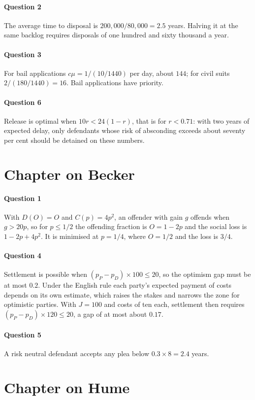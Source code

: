 \paragraph{Question 2} The average time to disposal is $200{,}000/80{,}000 = 2.5$ years. Halving it at the same backlog requires disposals of one hundred and sixty thousand a year.
\paragraph{Question 3} For bail applications $c\mu = 1/(10/1440)$ per day, about $144$; for civil suits $2/(180/1440) = 16$. Bail applications have priority.
\paragraph{Question 6} Release is optimal when $10r < 24(1-r)$, that is for $r < 0.71$: with two years of expected delay, only defendants whose risk of absconding exceeds about seventy per cent should be detained on these numbers.

\section*{Chapter on Becker}
\paragraph{Question 1} With $D(O) = O$ and $C(p) = 4p^2$, an offender with gain $g$ offends when $g > 20p$, so for $p\le 1/2$ the offending fraction is $O = 1 - 2p$ and the social loss is $1 - 2p + 4p^2$. It is minimised at $p = 1/4$, where $O = 1/2$ and the loss is $3/4$.
\paragraph{Question 4} Settlement is possible when $(p_P - p_D)\times 100\le 20$, so the optimism gap must be at most $0.2$. Under the English rule each party's expected payment of costs depends on its own estimate, which raises the stakes and narrows the zone for optimistic parties. With $J = 100$ and costs of ten each, settlement then requires $(p_P - p_D)\times 120\le 20$, a gap of at most about $0.17$.
\paragraph{Question 5} A risk neutral defendant accepts any plea below $0.3\times 8 = 2.4$ years.

\section*{Chapter on Hume}
